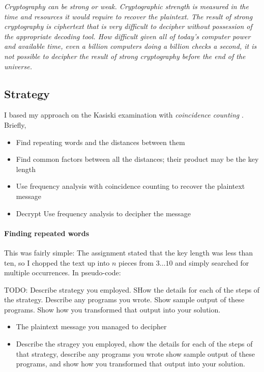 \documentclass[a4paper,english,12pt]{article}
\begin{document}
\textit{Cryptography can be strong or weak. Cryptographic strength is measured
in the time and resources it would require to recover the plaintext.  The
result of strong cryptography is ciphertext that is very difficult to decipher
without possession of the appropriate decoding tool. How difficult given all of
today's computer power and available time, even a billion computers doing a
billion checks a second, it is not possible to decipher the result of strong
cryptography before the end of the universe.}

\subsection{Strategy}

I based my approach on the Kasiski examination \cite{dalkilic2000interactive,
wiki:kasiski.examination} with \textit{coincidence
counting} \cite{coincidence.friedman}. Briefly,

\begin{itemize}
  \item Find repeating words and the distances between them
  \item Find common factors between all the distances; their product may be the
    key length
  \item Use frequency analysis with coincidence counting to recover the
    plaintext message
  \item Decrypt Use frequency analysis to decipher the message
\end{itemize}

\paragraph{Finding repeated words}

This was fairly simple: The assignment stated that the key length was less than
ten, so I chopped the text up into $n$ pieces from $3\dots10$ and simply
searched for multiple occurrences. In pseudo-code:

TODO: Describe strategy you employed. SHow the details for each of the steps of
the strategy. Describe any programs you wrote. Show sample output of these
programs. Show how you transformed that output into your solution.

\begin{itemize}
  \item The plaintext message you managed to decipher
  \item Describe the stragey you employed, show the details for each of the
    steps of that strategy, describe any programs you wrote show sample output
    of these programs, and show how you transformed that output into your
    solution.
\end{itemize}
\end{document}
